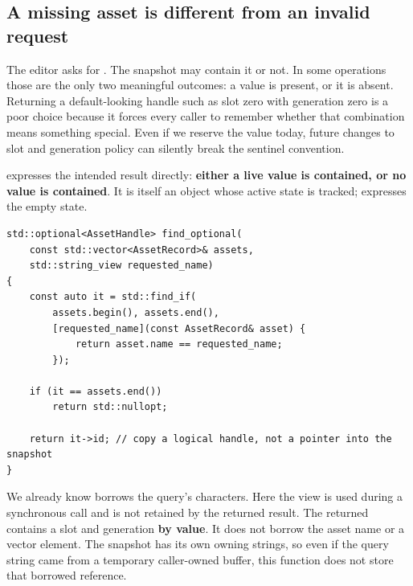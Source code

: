 \subsection{A missing asset is different from an invalid request}\label{01-foundations-i-ch006-a-missing-asset-is-different-from-an-invalid-request}

\hypertarget{01-foundations-i-ch006-a-missing-asset-is-different-from-an-invalid-request}{}

The editor asks for . The snapshot may contain it or not. In some operations those are the only two meaningful outcomes: a value is present, or it is absent. Returning a default-looking handle such as slot zero with generation zero is a poor choice because it forces every caller to remember whether that combination means something special. Even if we reserve the value today, future changes to slot and generation policy can silently break the sentinel convention.

 expresses the intended result directly: \textbf{either a live  value is contained, or no  value is contained}. It is itself an object whose active state is tracked;  expresses the empty state.

\begin{verbatim}
std::optional<AssetHandle> find_optional(
    const std::vector<AssetRecord>& assets,
    std::string_view requested_name)
{
    const auto it = std::find_if(
        assets.begin(), assets.end(),
        [requested_name](const AssetRecord& asset) {
            return asset.name == requested_name;
        });

    if (it == assets.end())
        return std::nullopt;

    return it->id; // copy a logical handle, not a pointer into the snapshot
}
\end{verbatim}

We already know  borrows the query's characters. Here the view is used during a synchronous call and is not retained by the returned result. The returned  contains a slot and generation \textbf{by value}. It does not borrow the asset name or a vector element. The snapshot has its own owning strings, so even if the query string came from a temporary caller-owned buffer, this function does not store that borrowed reference.

